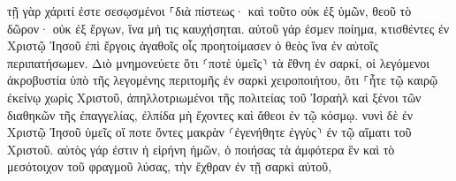 \documentclass{openreader}
\begin{document}
τῇ γὰρ χάριτί ἐστε σεσῳσμένοι ⸀διὰ πίστεως· καὶ τοῦτο οὐκ ἐξ ὑμῶν, θεοῦ τὸ δῶρον· 
οὐκ ἐξ ἔργων, ἵνα μή τις καυχήσηται. 
αὐτοῦ γάρ ἐσμεν ποίημα, κτισθέντες ἐν Χριστῷ Ἰησοῦ ἐπὶ ἔργοις ἀγαθοῖς οἷς προητοίμασεν ὁ θεὸς ἵνα ἐν αὐτοῖς περιπατήσωμεν. 
Διὸ μνημονεύετε ὅτι ⸂ποτὲ ὑμεῖς⸃ τὰ ἔθνη ἐν σαρκί, οἱ λεγόμενοι ἀκροβυστία ὑπὸ τῆς λεγομένης περιτομῆς ἐν σαρκὶ χειροποιήτου, 
ὅτι ⸀ἦτε τῷ καιρῷ ἐκείνῳ χωρὶς Χριστοῦ, ἀπηλλοτριωμένοι τῆς πολιτείας τοῦ Ἰσραὴλ καὶ ξένοι τῶν διαθηκῶν τῆς ἐπαγγελίας, ἐλπίδα μὴ ἔχοντες καὶ ἄθεοι ἐν τῷ κόσμῳ. 
νυνὶ δὲ ἐν Χριστῷ Ἰησοῦ ὑμεῖς οἵ ποτε ὄντες μακρὰν ⸂ἐγενήθητε ἐγγὺς⸃ ἐν τῷ αἵματι τοῦ Χριστοῦ. 
αὐτὸς γάρ ἐστιν ἡ εἰρήνη ἡμῶν, ὁ ποιήσας τὰ ἀμφότερα ἓν καὶ τὸ μεσότοιχον τοῦ φραγμοῦ λύσας, τὴν ἔχθραν ἐν τῇ σαρκὶ αὐτοῦ, 
\end{document}
